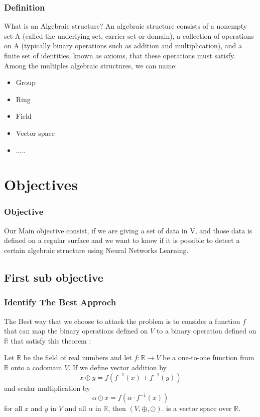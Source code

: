 \documentclass{beamer}
\begin{document}
        
    \begin{frame}
        \frametitle{Definition}
        What is an Algebraic structure? An algebraic structure consists of a nonempty set A (called the underlying set, carrier set or domain), a collection of operations on A (typically binary operations such as addition and multiplication), and a finite set of identities, known as axioms, that these operations must satisfy.
        Among the multiples algebraic structures, we can name:
        \begin{itemize}
            \item Group
            \item Ring
            \item Field
            \item Vector space
            \item .....
        \end{itemize}
    \end{frame}

    \section{Objectives}
    \begin{frame}
        \frametitle{Objective}
        Our Main objective consist,  if we are giving a set of data in V, and those data is defined on a regular surface and we want to know if it is possible to detect a certain algebraic structure using Neural Networks Learning.
    \end{frame}


    \subsection{First sub objective} 
    \begin{frame}
        \frametitle{Identify The Best Approch}
        The Best way that we choose to attack the problem  is to consider a function $f$ that can map the binary operations defined on $V$ to a binary operation defined on $\mathbb{R}$ that satisfy this theorem : 
        \begin{theorem}\label{thm:1}
            \rm{
            Let $\mathbb{R}$ be the field of real numbers and let $f: \mathbb{R} \rightarrow V$ be a one-to-one function from $\mathbb{R}$ onto a codomain $V$. If we define vector addition by
            $$
            x \oplus y=f\left(f^{-1}(x)+f^{-1}(y)\right)
            $$
            and scalar multiplication by
            $$
            \alpha \odot x=f\left(\alpha \cdot f^{-1}(x)\right)
            $$
            for all $x$ and $y$ in $V$ and all $\alpha$ in $\mathbb{R}$, then 
            $(V, \oplus, \odot)$. is a vector space over $\mathbb{R}$.
            }
        \end{theorem}
    \end{frame}
    
\end{document}
